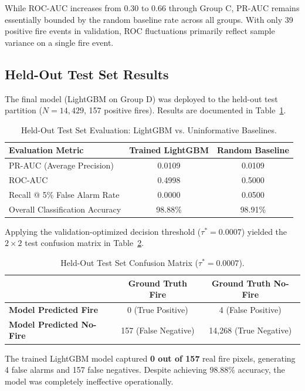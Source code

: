 \documentclass[10pt,journal,compsoc]{IEEEtran}
\begin{document}
While ROC-AUC increases from $0.30$ to $0.66$ through Group C, PR-AUC remains essentially bounded by the random baseline rate across all groups. With only 39 positive fire events in validation, ROC fluctuations primarily reflect sample variance on a single fire event.

\subsection{Held-Out Test Set Results}
The final model (LightGBM on Group D) was deployed to the held-out test partition ($N=14,429$, 157 positive fires). Results are documented in Table~\ref{tab:test_results}.

\begin{table}[H]
\centering
\caption{Held-Out Test Set Evaluation: LightGBM vs. Uninformative Baselines.}
\label{tab:test_results}
\begin{tabular}{lcc}
\toprule
\textbf{Evaluation Metric} & \textbf{Trained LightGBM} & \textbf{Random Baseline} \\
\midrule
PR-AUC (Average Precision) & 0.0109 & 0.0109 \\
ROC-AUC & 0.4998 & 0.5000 \\
Recall @ 5\% False Alarm Rate & 0.0000 & 0.0500 \\
Overall Classification Accuracy & 98.88\% & 98.91\% \\
\bottomrule
\end{tabular}
\end{table}

Applying the validation-optimized decision threshold ($\tau^* = 0.0007$) yielded the $2 \times 2$ test confusion matrix in Table~\ref{tab:confusion_matrix}.

\begin{table}[H]
\centering
\caption{Held-Out Test Set Confusion Matrix ($\tau^* = 0.0007$).}
\label{tab:confusion_matrix}
\begin{tabular}{lcc}
\toprule
& \textbf{Ground Truth Fire} & \textbf{Ground Truth No-Fire} \\
\midrule
\textbf{Model Predicted Fire} & 0 (True Positive) & 4 (False Positive) \\
\textbf{Model Predicted No-Fire} & 157 (False Negative) & 14,268 (True Negative) \\
\bottomrule
\end{tabular}
\end{table}

The trained LightGBM model captured \textbf{0 out of 157} real fire pixels, generating 4 false alarms and 157 false negatives. Despite achieving $98.88\%$ accuracy, the model was completely ineffective operationally.
\end{document}
